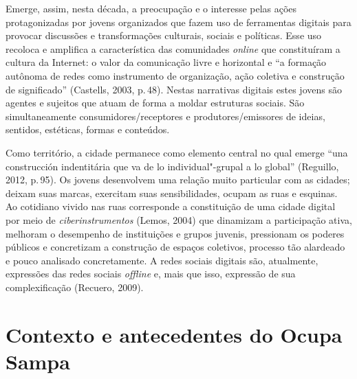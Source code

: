 Emerge, assim, nesta década, a preocupação e o interesse pelas ações
protagonizadas por jovens organizados que fazem uso de ferramentas
digitais para provocar discussões e transformações culturais, sociais e
políticas. Esse uso recoloca e amplifica a característica das
comunidades \emph{online} que constituíram a cultura da Internet: o
valor da comunicação livre e horizontal e ``a formação autônoma de redes
como instrumento de organização, ação coletiva e construção de
significado'' (Castells, 2003, p.\,48). Nestas narrativas digitais
estes jovens são agentes e sujeitos que atuam de forma a moldar
estruturas sociais. São simultaneamente consumidores/receptores e
produtores/emissores de ideias, sentidos, estéticas, formas e conteúdos.

Como território, a cidade permanece como elemento central no qual emerge
``una construcción indentitária que va de lo individual"-grupal a lo
global'' (Reguillo, 2012, p.\,95). Os jovens desenvolvem uma relação
muito particular com as cidades; deixam suas marcas, exercitam suas
sensibilidades, ocupam as ruas e esquinas. Ao cotidiano vivido nas ruas
corresponde a constituição de uma cidade digital por meio de
\emph{ciberinstrumentos} (Lemos, 2004) que dinamizam a participação
ativa, melhoram o desempenho de instituições e grupos juvenis,
pressionam os poderes públicos e concretizam a construção de espaços
coletivos, processo tão alardeado e pouco analisado concretamente. A
redes sociais digitais são, atualmente, expressões das redes sociais
\emph{offline} e, mais que isso, expressão de sua complexificação
(Recuero, 2009).

\section{Contexto e antecedentes do Ocupa Sampa}

